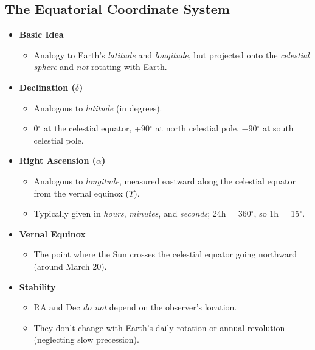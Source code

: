 \subsection{The Equatorial Coordinate System}
\begin{itemize}
  \item \textbf{Basic Idea}
  \begin{itemize}
    \item Analogy to Earth’s \emph{latitude} and \emph{longitude}, but projected onto the \emph{celestial sphere} and \emph{not} rotating with Earth.
  \end{itemize}
  \item \textbf{Declination ($\delta$)}
  \begin{itemize}
    \item Analogous to \emph{latitude} (in degrees).
    \item 0$^\circ$ at the celestial equator, +90$^\circ$ at north celestial pole, $-$90$^\circ$ at south celestial pole.
  \end{itemize}
  \item \textbf{Right Ascension ($\alpha$)}
  \begin{itemize}
    \item Analogous to \emph{longitude}, measured eastward along the celestial equator from the vernal equinox ($\Upsilon$).
    \item Typically given in \emph{hours}, \emph{minutes}, and \emph{seconds}; 24h = 360$^\circ$, so 1h = 15$^\circ$.
  \end{itemize}
  \item \textbf{Vernal Equinox}
  \begin{itemize}
    \item The point where the Sun crosses the celestial equator going northward (around March 20).
  \end{itemize}
  \item \textbf{Stability}
  \begin{itemize}
    \item RA and Dec \emph{do not} depend on the observer’s location.
    \item They don’t change with Earth’s daily rotation or annual revolution (neglecting slow precession).
  \end{itemize}
\end{itemize}

